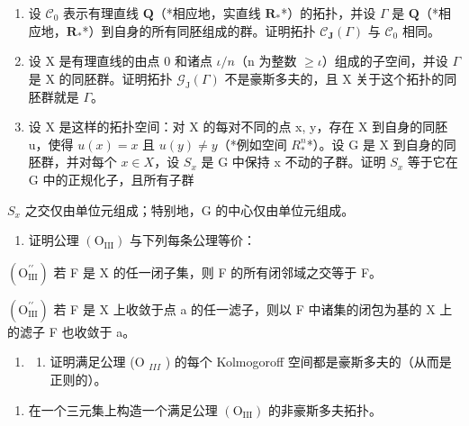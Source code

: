 \begin{enumerate}
\def\labelenumi{\alph{enumi})}
\setcounter{enumi}{2}
\item
  设 \(\mathcal{C}_{0}\) 表示有理直线 \(\mathbf{Q}\)（*相应地，实直线 \(\mathbf{R}_{*}\)*）的拓扑，并设 \(\Gamma\) 是 \(\mathbf{Q}\)（*相应地，\(\mathbf{R}_{*}\)*）到自身的所有同胚组成的群。证明拓扑 \(\mathcal{C}_{\mathbf{J}}(\Gamma)\) 与 \(\mathcal{C}_{0}\) 相同。
\item
  设 X 是有理直线的由点 0 和诸点 \(\iota/n\)（n 为整数 \(\geqslant\iota\)）组成的子空间，并设 \(\Gamma\) 是 X 的同胚群。证明拓扑 \(\mathcal{G}_{\mathrm{J}}(\Gamma)\) 不是豪斯多夫的，且 X 关于这个拓扑的同胚群就是 \(\Gamma\)。
\item
  设 X 是这样的拓扑空间：对 X 的每对不同的点 x, y，存在 X 到自身的同胚 u，使得 \(u(x) = x\) 且 \(u(y) \neq y\)（*例如空间 \(R^{n}_{*}\)*）。设 G 是 X 到自身的同胚群，并对每个 \(x \in X\)，设 \(S_{x}\) 是 G 中保持 x 不动的子群。证明 \(S_{x}\) 等于它在 G 中的正规化子，且所有子群
\end{enumerate}

\(S_{x}\) 之交仅由单位元组成；特别地，G 的中心仅由单位元组成。

\begin{enumerate}
\def\labelenumi{\arabic{enumi})}
\setcounter{enumi}{13}
\tightlist
\item
  证明公理 \((\mathrm{O}_{\mathrm{III}})\) 与下列每条公理等价：
\end{enumerate}

\((\mathrm{O}_{\mathrm{III}}^{\prime\prime})\) 若 F 是 X 的任一闭子集，则 F 的所有闭邻域之交等于 F。

\((\mathrm{O}_{\mathrm{III}}^{\prime\prime})\) 若 F 是 X 上收敛于点 a 的任一滤子，则以 F 中诸集的闭包为基的 X 上的滤子 F 也收敛于 a。

\begin{enumerate}
\def\labelenumi{\arabic{enumi})}
\setcounter{enumi}{14}
\tightlist
\item
  \begin{enumerate}
  \def\labelenumii{\alph{enumii})}
  \tightlist
  \item
    证明满足公理 (O \(_{III}\) ) 的每个 Kolmogoroff 空间都是豪斯多夫的（从而是正则的）。
  \end{enumerate}
\end{enumerate}

\begin{enumerate}
\def\labelenumi{\alph{enumi})}
\setcounter{enumi}{1}
\tightlist
\item
  在一个三元集上构造一个满足公理 \((\mathrm{O}_{\mathrm{III}})\) 的非豪斯多夫拓扑。
\end{enumerate}

